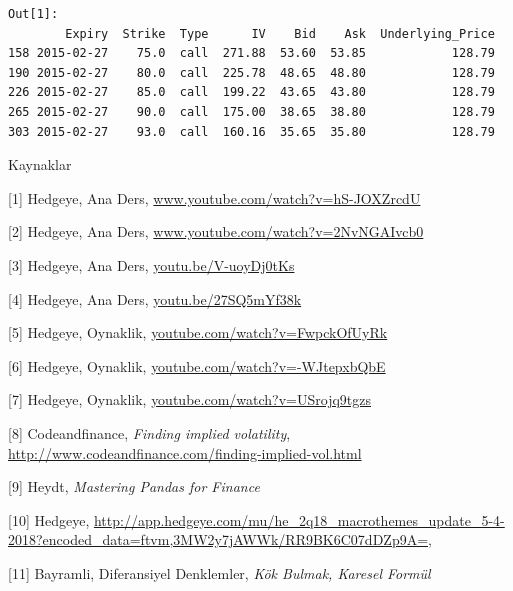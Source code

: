 \documentclass[12pt,fleqn]{article}\usepackage{../../common}
\begin{document}
\begin{verbatim}
Out[1]: 
        Expiry  Strike  Type      IV    Bid    Ask  Underlying_Price
158 2015-02-27    75.0  call  271.88  53.60  53.85            128.79
190 2015-02-27    80.0  call  225.78  48.65  48.80            128.79
226 2015-02-27    85.0  call  199.22  43.65  43.80            128.79
265 2015-02-27    90.0  call  175.00  38.65  38.80            128.79
303 2015-02-27    93.0  call  160.16  35.65  35.80            128.79
\end{verbatim}

Kaynaklar

[1] Hedgeye, Ana Ders, \url{www.youtube.com/watch?v=hS-JOXZrcdU}

[2] Hedgeye, Ana Ders, \url{www.youtube.com/watch?v=2NvNGAIvcb0}

[3] Hedgeye, Ana Ders, \url{youtu.be/V-uoyDj0tKs}

[4] Hedgeye, Ana Ders, \url{youtu.be/27SQ5mYf38k}

[5] Hedgeye, Oynaklik, \url{youtube.com/watch?v=FwpckOfUyRk}

[6] Hedgeye, Oynaklik, \url{youtube.com/watch?v=-WJtepxbQbE}

[7] Hedgeye, Oynaklik, \url{youtube.com/watch?v=USrojq9tgzs}

[8] Codeandfinance, {\em Finding implied volatility},
    \url{http://www.codeandfinance.com/finding-implied-vol.html}

[9] Heydt, {\em Mastering Pandas for Finance}

[10] Hedgeye, \url{http://app.hedgeye.com/mu/he_2q18_macrothemes_update_5-4-2018?encoded_data=ftvm,3MW2y7jAWWk/RR9BK6C07dDZp9A=,}

[11] Bayramli, Diferansiyel Denklemler, {\em Kök Bulmak, Karesel Formül}
\end{document}
